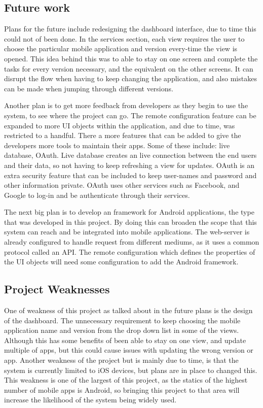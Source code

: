 \subsection{Future work}

Plans for the future include redesigning the dashboard interface, due to time this could not of been done. In the services section, each view requires the user to choose the particular mobile application and version every-time the view is opened. This idea behind this was to able to stay on one screen and complete the tasks for every version necessary, and the equivalent on the other screens. It can disrupt the flow when having to keep changing the application, and also mistakes can be made when jumping through different versions.

Another plan is to get more feedback from developers as they begin to use the system, to see where the project can go. The remote configuration feature can be expanded to more UI objects within the application, and due to time, was restricted to a handful. There a more features that can be added to give the developers more tools to maintain their apps. Some of these include: live database, OAuth. Live database creates an live connection between the end users and their data, so not having to keep refreshing a view for updates. OAuth is an extra security feature that can be included to keep user-names and password and other information private. OAuth uses other services such as Facebook, and Google to log-in and be authenticate through their services. 

The next big plan is to develop an framework for Android applications, the type that was developed in this project. By doing this can broaden the scope that this system can reach and be integrated into mobile applications. The web-server is already configured to handle request from different mediums, as it uses a common protocol called an API. The remote configuration which defines the properties of the UI objects will need some configuration to add the Android framework. 

\subsection{Project Weaknesses}

One of weakness of this project as talked about in the future plans is the design of the dashboard. The unnecessary requirement to keep choosing the mobile application name and version from the drop down list in some of the views. Although this has some benefits of been able to stay on one view, and update multiple of apps, but this could cause issues with updating the wrong version or app. Another weakness of the project but is mainly due to time, is that the system is currently limited to iOS devices, but plans are in place to changed this. This weakness is one of the largest of this project, as the statics of the highest number of mobile apps is Android, so bringing this project to that area will increase the likelihood of the system being widely used. 

